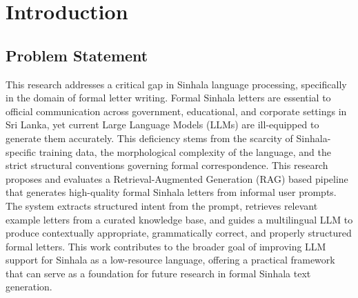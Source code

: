 \documentclass[12pt]{uomthesis}
\begin{document}
\begin{ToC}
\makeatletter
 \makeatother
\end{ToC}

\iffigures
    \begin{LoF}
        \makeatletter
        \makeatother
    \end{LoF}
\fi


\iftables
    \begin{LoT}
    \makeatletter
    \makeatother
    \end{LoT}
\fi

\ifabbrs
    \printacronyms
\fi

\ifappens
    \begin{LoAp}
    \makeatletter
    \makeatother
    \end{LoAp}
\fi

\startContent


\chapter{Introduction}

\section{Problem Statement}
This research addresses a critical gap in Sinhala language processing, specifically in the domain of formal letter writing. Formal Sinhala letters are essential to official communication across government, educational, and corporate settings in Sri Lanka, yet current Large Language Models (LLMs) are ill-equipped to generate them accurately. This deficiency stems from the scarcity of Sinhala-specific training data, the morphological complexity of the language, and the strict structural conventions governing formal correspondence. This research proposes and evaluates a Retrieval-Augmented Generation (RAG) based pipeline that generates high-quality formal Sinhala letters from informal user prompts. The system extracts structured intent from the prompt, retrieves relevant example letters from a curated knowledge base, and guides a multilingual LLM to produce contextually appropriate, grammatically correct, and properly structured formal letters. This work contributes to the broader goal of improving LLM support for Sinhala as a low-resource language, offering a practical framework that can serve as a foundation for future research in formal Sinhala text generation.
\end{document}
